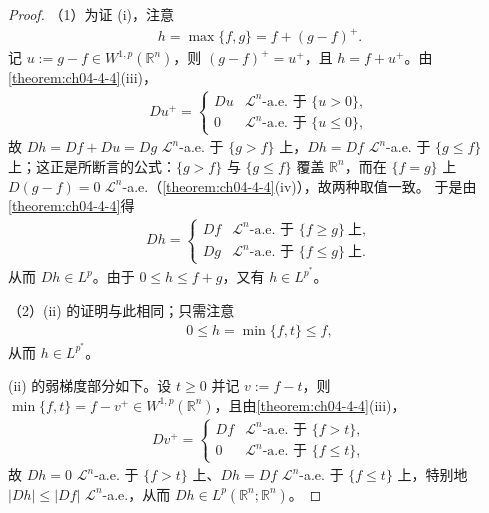 \documentclass[../../main.tex]{subfiles}%
\begin{document}
\begin{proof}
（1）为证 (i)，注意
\begin{align*}
h=\max\{f,g\}=f+(g-f)^+ .
\end{align*}
记 $u:=g-f\in W^{1,p}(\mathbb{R}^n)$，则 $(g-f)^+=u^+$，且 $h=f+u^+$。由\cref{theorem:ch04-4-4}(iii)，%
\begin{align*}
Du^+=
\begin{cases}
Du & \mathcal{L}^n\text{-a.e. 于 }\{u>0\},\\
0 & \mathcal{L}^n\text{-a.e. 于 }\{u\leqslant0\},
\end{cases}
\end{align*}
故 $Dh=Df+Du=Dg$ $\mathcal{L}^n$-a.e. 于 $\{g>f\}$ 上，$Dh=Df$ $\mathcal{L}^n$-a.e. 于 $\{g\leqslant f\}$ 上；这正是所断言的公式：$\{g>f\}$ 与 $\{g\leqslant f\}$ 覆盖 $\mathbb{R}^n$，而在 $\{f=g\}$ 上 $D(g-f)=0$ $\mathcal{L}^n$-a.e.（\cref{theorem:ch04-4-4}(iv)），故两种取值一致。%
于是由\cref{theorem:ch04-4-4}得%
\begin{align*}
Dh=
\begin{cases}
Df & \mathcal{L}^n\text{-a.e. 于 }\{f\geqslant g\}\ \text{上},\\[2pt]
Dg & \mathcal{L}^n\text{-a.e. 于 }\{f\leqslant g\}\ \text{上}.
\end{cases}
\end{align*}
从而 $Dh\in L^p$。由于 $0\leqslant h\leqslant f+g$，又有 $h\in L^{p^*}$。

（2）(ii) 的证明与此相同；只需注意
\begin{align*}
0\leqslant h=\min\{f,t\}\leqslant f,
\end{align*}
从而 $h\in L^{p^*}$。

(ii) 的弱梯度部分如下。设 $t\geqslant0$ 并记 $v:=f-t$，则 $\min\{f,t\}=f-v^+\in W^{1,p}(\mathbb{R}^n)$，且由\cref{theorem:ch04-4-4}(iii)，%
\begin{align*}
Dv^+=
\begin{cases}
Df & \mathcal{L}^n\text{-a.e. 于 }\{f>t\},\\
0 & \mathcal{L}^n\text{-a.e. 于 }\{f\leqslant t\},
\end{cases}
\end{align*}
故 $Dh=0$ $\mathcal{L}^n$-a.e. 于 $\{f>t\}$ 上、$Dh=Df$ $\mathcal{L}^n$-a.e. 于 $\{f\leqslant t\}$ 上，特别地 $\lvert Dh\rvert\leqslant\lvert Df\rvert$ $\mathcal{L}^n$-a.e.，从而 $Dh\in L^p(\mathbb{R}^n;\mathbb{R}^n)$。


\end{proof}
\end{document}
